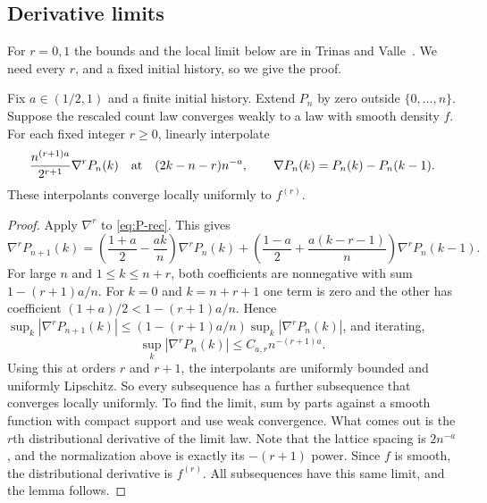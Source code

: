 \subsection{Derivative limits}\label{app:derivative-limits}

For $r=0,1$ the bounds and the local limit below are in Trinas and
Valle~\cite[Proposition~2.1 and Theorem~3.1]{tv2026}. We need every
$r$, and a fixed initial history, so we give the proof.

\begin{lemma}\label{lem:derivative-limits}
Fix $a\in(1/2,1)$ and a finite initial history. Extend $P_n$ by zero
outside $\{0,\ldots,n\}$. Suppose the rescaled
count law converges weakly to a law with smooth density $f$.
For each fixed integer $r\ge0$, linearly interpolate
\[
 \frac{n^{(r+1)a}}{2^{r+1}}\nabla^rP_n(k)
 \quad\hbox{at}\quad (2k-n-r)n^{-a},
 \qquad \nabla P_n(k)=P_n(k)-P_n(k-1).
\]
These interpolants converge locally uniformly to $f^{(r)}$.
\end{lemma}

\begin{proof}
Apply $\nabla^r$ to \eqref{eq:P-rec}. This gives
\[
 \nabla^rP_{n+1}(k)
 =\left(\frac{1+a}{2}-\frac{ak}{n}\right)\nabla^rP_n(k)
 +\left(\frac{1-a}{2}+\frac{a(k-r-1)}n\right)\nabla^rP_n(k-1).
\]
For large $n$ and $1\le k\le n+r$, both coefficients are nonnegative
with sum $1-(r+1)a/n$. For $k=0$ and $k=n+r+1$ one term is zero and
the other has coefficient $(1+a)/2<1-(r+1)a/n$. Hence
$\sup_k|\nabla^rP_{n+1}(k)|\le(1-(r+1)a/n)\sup_k|\nabla^rP_n(k)|$,
and iterating,
\[
 \sup_k|\nabla^rP_n(k)|\le C_{a,r}n^{-(r+1)a}.
\]
Using this at orders $r$ and $r+1$, the interpolants are uniformly
bounded and uniformly Lipschitz. So every subsequence has a further
subsequence that converges locally uniformly. To find the limit, sum
by parts against a smooth function with compact support and use weak
convergence. What comes out is the $r$th distributional derivative of
the limit law. Note that the lattice spacing is $2n^{-a}$, and the
normalization above is exactly its $-(r+1)$ power. Since $f$ is
smooth, the distributional derivative is $f^{(r)}$. All subsequences
have this same limit, and the lemma follows.
\end{proof}
